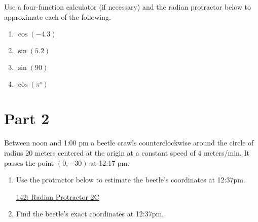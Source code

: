 \documentclass{ximera}
\begin{document}
\begin{question}  \label{Qghhybyhyy}
Use a four-function calculator (if necessary) and the radian protractor below to approximate each of the following.

\begin{enumerate}
\item $\cos(-4.3)$

\item $\sin(5.2)$

\item $\sin(90)$

\item $\cos(\pi^\circ)$

\end{enumerate} 

\begin{onlineOnly}
    \begin{center}
\end{center}
\end{onlineOnly}

\end{question}


\section{Part 2}

\begin{question}  \label{Q9dfe94tf4}

Between noon and 1:00 pm a beetle crawls counterclockwise around the circle of radius $20$ meters centered at the origin at a constant speed of $4$ meters/min. It passes the point $(0,-30)$ at 12:17 pm.

\begin{enumerate}

\item Use the protractor below to estimate the beetle's coordinates at 12:37pm. 

\begin{onlineOnly}
    \begin{center}
\end{center}
\end{onlineOnly}

\href{https://www.desmos.com/calculator/lbkveixdno}{142: Radian Protractor 2C}

\item Find the beetle's exact coordinates at 12:37pm.

\end{enumerate}

\end{question}
\end{document}
